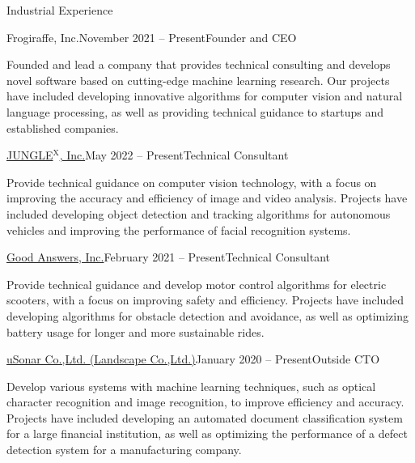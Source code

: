 \documentclass{resume} %
\begin{document}
\begin{rSection}{Industrial Experience}

    \begin{rSubsection}{Frogiraffe, Inc.}{November 2021 -- Present}{Founder and CEO}{}
    \item Founded and lead a company that provides technical consulting and develops novel software based on cutting-edge machine learning research. Our projects have included developing innovative algorithms for computer vision and natural language processing, as well as providing technical guidance to startups and established companies.
    \end{rSubsection}

    \begin{rSubsection}{\href{https://jungle.xyz/}{JUNGLE${}^\text{X}$, Inc.}}{May 2022 -- Present}{Technical Consultant}{}
    \item Provide technical guidance on computer vision technology, with a focus on improving the accuracy and efficiency of image and video analysis. Projects have included developing object detection and tracking algorithms for autonomous vehicles and improving the performance of facial recognition systems.
    \end{rSubsection}

    \begin{rSubsection}{\href{https://info.gbiz.go.jp/hojin/ichiran?hojinBango=2430001082637}{Good Answers, Inc.}}{February 2021 -- Present}{Technical Consultant}{}
    \item Provide technical guidance and develop motor control algorithms for electric scooters, with a focus on improving safety and efficiency. Projects have included developing algorithms for obstacle detection and avoidance, as well as optimizing battery usage for longer and more sustainable rides.
    \end{rSubsection}

    \begin{rSubsection}{\href{https://www.landscape.co.jp/}{uSonar Co.,Ltd. (Landscape Co.,Ltd.)}}{January 2020 -- Present}{Outside CTO}{}
    \item Develop various systems with machine learning techniques, such as optical character recognition and image recognition, to improve efficiency and accuracy. Projects have included developing an automated document classification system for a large financial institution, as well as optimizing the performance of a defect detection system for a manufacturing company.
    \end{rSubsection}


\end{rSection}
\end{document}
